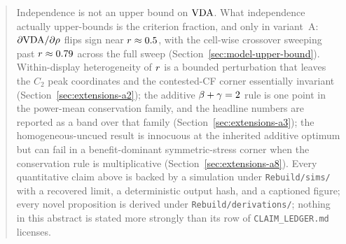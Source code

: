 \begin{abstract}
Independence is not an upper bound on $\VDA$.  What independence
actually upper-bounds is the criterion fraction, and only in
variant~A: $\partial \VDA / \partial \corr$ flips sign near
$\Rsens \approx 0.5$, with the cell-wise crossover sweeping past
$\Rsens \approx 0.79$ across the full sweep
(Section~\ref{sec:model-upper-bound}).  Within-display heterogeneity
of $\Rsens$ is a bounded perturbation that leaves the $C_2$ peak
coordinates and the contested-CF corner essentially invariant
(Section~\ref{sec:extensions-a2}); the additive
$\benefit + \cost = 2$ rule is one point in the power-mean
conservation family, and the headline numbers are reported as a
band over that family (Section~\ref{sec:extensions-a3}); the
homogeneous-uncued result is innocuous at the inherited additive
optimum but can fail in a benefit-dominant symmetric-stress corner
when the conservation rule is multiplicative
(Section~\ref{sec:extensions-a8}).  Every quantitative claim above
is backed by a simulation under \texttt{Rebuild/sims/} with a
recovered limit, a deterministic output hash, and a captioned
figure; every novel proposition is derived under
\texttt{Rebuild/derivations/}; nothing in this abstract is stated
more strongly than its row of \texttt{CLAIM\_LEDGER.md} licenses.
\end{abstract}
